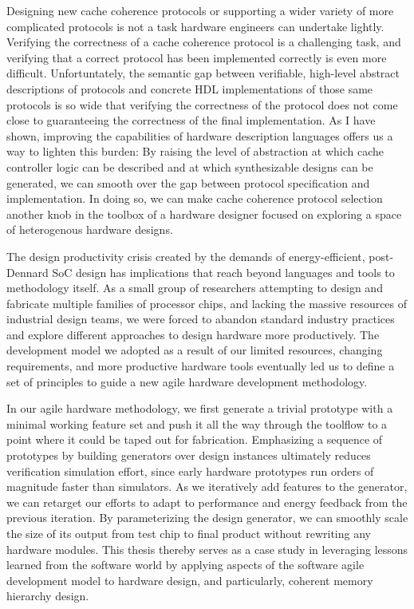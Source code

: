 Designing new cache coherence protocols or supporting a wider variety of more complicated protocols is not a task hardware engineers can undertake lightly.
Verifying the correctness of a cache coherence protocol is a challenging task, and
verifying that a correct protocol has been implemented correctly is even more difficult.
Unfortuntately, the semantic gap between verifiable, high-level abstract descriptions of protocols and 
concrete HDL implementations of those same protocols is so wide that verifying the correctness of the protocol
does not come close to guaranteeing the correctness of the final implementation.
As I have shown, improving the capabilities of hardware description languages offers us a way to lighten this burden:
By raising the level of abstraction at which cache controller logic can be described and at which synthesizable designs can be generated,
we can smooth over the gap between protocol specification and implementation.
In doing so, we can make cache coherence protocol selection another knob in the toolbox of a hardware designer focused on exploring a space of heterogenous hardware designs.

The design productivity crisis created by the demands of energy-efficient, post-Dennard SoC design has implications that reach beyond
languages and tools to methodology itself.
As a small group of researchers attempting to design and fabricate multiple families of processor chips,
and lacking the massive resources of industrial design teams,
we were forced to abandon standard industry practices and explore different
approaches to design hardware more productively.
The development model we adopted as a result of our limited resources, changing requirements, and more productive hardware tools
eventually led us to define a set of principles to guide a new agile hardware development methodology.

In our agile hardware methodology, we first generate a trivial prototype with a minimal working feature set and push it all the way through the toolflow to a point where it could be taped out for fabrication.
Emphasizing a sequence of prototypes by building generators over design instances ultimately reduces verification simulation effort, 
since early hardware prototypes run orders of magnitude faster than simulators.
As we iteratively add features to the generator, we can retarget our efforts to adapt to performance and energy feedback from the previous iteration.
By parameterizing the design generator, we can smoothly scale the size of its output from test chip to final product without rewriting any hardware modules.
This thesis thereby serves as a case study in leveraging lessons learned from the software world by
applying aspects of the software agile development model to hardware design,
and particularly, coherent memory hierarchy design.

